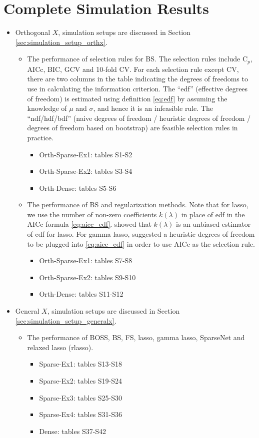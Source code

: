 \section{Complete Simulation Results}
\label{sec:supplement_simu}
\begin{itemize}
	\item Orthogonal $X$, simulation setups are discussed in Section \ref{sec:simulation_setup_orthx}. 
	\begin{itemize}
		\item The performance of selection rules for BS. The selection rules include C$_p$, AICc, BIC, GCV and 10-fold CV. For each selection rule except CV, there are two columns in the table indicating the degrees of freedoms to use in calculating the information criterion. The ``edf'' (effective degrees of freedom) is estimated using definition \eqref{eq:edf} by assuming the knowledge of $\mu$ and $\sigma$, and hence it is an infeasible rule. The ``ndf/hdf/bdf'' (naive degrees of freedom /  heuristic degrees of freedom / degrees of freedom based on bootstrap) are feasible selection rules in practice. 
		\begin{itemize}
			\item Orth-Sparse-Ex1: tables S1-S2
			\item Orth-Sparse-Ex2: tables S3-S4
			\item Orth-Dense: tables S5-S6
		\end{itemize}
		\item The performance of BS and regularization methods. Note that for lasso, we use the number of non-zero coefficients $k(\lambda)$ in place of edf in the AICc formula \eqref{eq:aicc_edf}.  showed that $k(\lambda)$ is an unbiased estimator of edf for lasso. For gamma lasso,  suggested a heuristic degrees of freedom to be plugged into \eqref{eq:aicc_edf} in order to use AICc as the selection rule.
		\begin{itemize}
			\item Orth-Sparse-Ex1: tables S7-S8
			\item Orth-Sparse-Ex2: tables S9-S10
			\item Orth-Dense: tables S11-S12
		\end{itemize}
	\end{itemize}
	\item General $X$, simulation setups are discussed in Section \ref{sec:simulation_setup_generalx}. 
	\begin{itemize}
		\item The performance of BOSS, BS, FS, lasso, gamma lasso, SparseNet and relaxed lasso (rlasso).
		\begin{itemize}
			\item Sparse-Ex1: tables S13-S18
			\item Sparse-Ex2: tables S19-S24
			\item Sparse-Ex3: tables S25-S30
			\item Sparse-Ex4: tables S31-S36
			\item Dense: tables S37-S42
		\end{itemize}
	\end{itemize}
\end{itemize}

